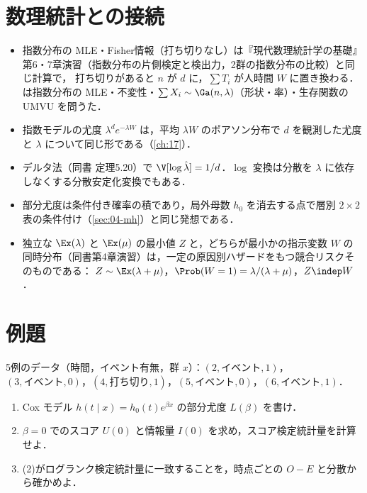 \section{数理統計との接続}\label{sec:10-link}
\begin{linkbox}
\begin{itemize}
\item 指数分布の MLE・Fisher情報（打ち切りなし）は『現代数理統計学の基礎』第6・7章演習（指数分布の片側検定と検出力，2群の指数分布の比較）と同じ計算で，
      打ち切りがあると $n$ が $d$ に，$\sum T_i$ が人時間 $W$ に置き換わる．
       は指数分布の MLE・不変性・$\sum X_i\sim\Ga(n,\lambda)$（形状・率）・生存関数の UMVU を問うた．
\item 指数モデルの尤度 $\lambda^de^{-\lambda W}$ は，平均 $\lambda W$ のポアソン分布で $d$ を観測した尤度と $\lambda$ について同じ形である（\cref{ch:17}）．
\item デルタ法（同書 定理5.20）で $\V[\log\hat\lambda]=1/d$．$\log$ 変換は分散を $\lambda$ に依存しなくする分散安定化変換でもある．
\item 部分尤度は条件付き確率の積であり，局外母数 $h_0$ を消去する点で層別 $2\times2$ 表の条件付け（\cref{sec:04-mh}）と同じ発想である．
\item 独立な $\Ex(\lambda)$ と $\Ex(\mu)$ の最小値 $Z$ と，どちらが最小かの指示変数 $W$ の同時分布（同書第4章演習）は，一定の原因別ハザードをもつ競合リスクそのものである：
      $Z\sim\Ex(\lambda+\mu)$，$\Prob(W=1)=\lambda/(\lambda+\mu)$，$Z\indep W$．
\end{itemize}
\end{linkbox}

\section{例題}\label{sec:10-ex}
\begin{reidai}[部分尤度とスコア検定]\label{reidai:10-1}
5例のデータ（時間，イベント有無，群 $x$）：$(2,\text{イベント},1)$，$(3,\text{イベント},0)$，$(4,\text{打ち切り},1)$，$(5,\text{イベント},0)$，$(6,\text{イベント},1)$．
\begin{enumerate}[label=(\arabic*)]
\item Cox モデル $h(t\mid x)=h_0(t)e^{\beta x}$ の部分尤度 $L(\beta)$ を書け．
\item $\beta=0$ でのスコア $U(0)$ と情報量 $I(0)$ を求め，スコア検定統計量を計算せよ．
\item (2)がログランク検定統計量に一致することを，時点ごとの $O-E$ と分散から確かめよ．
\end{enumerate}
\end{reidai}


